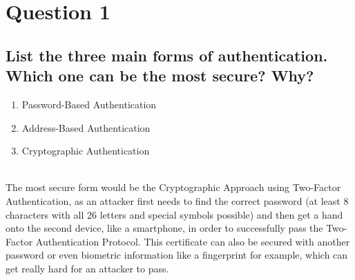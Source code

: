 \documentclass{report}
\begin{document}
	\section{Question 1}
	\startsection
		\renewcommand{\thesubsection}{\thesection.\Alph{subsection}}
		\subsection{List the three main forms of authentication. Which one can be the most secure? Why?}
		\startsubsection
			\begin{enumerate}[\textbullet]
				\item Password-Based Authentication
				\item Address-Based Authentication
				\item Cryptographic Authentication
			\end{enumerate}
			\hfill \\
			\noindent The most secure form would be the Cryptographic Approach using Two-Factor Authentication, as an attacker first needs to find the correct password (at least 8 characters with all 26 letters and special symbols possible) and then get a hand onto the second device, like a smartphone, in order to successfully pass the Two-Factor Authentication Protocol. This certificate can also be secured with another password or even biometric information like a fingerprint for example, which can get really hard for an attacker to pass.
		\closesection
		
\end{document}
